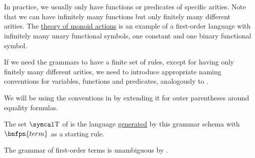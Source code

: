 \begin{definition}
\begin{DefEnum}
\begin{bnf*}
       \\
      \bnfmore                  {\hspace{3cm} \vdots} \\
       \\
      \bnfmore                  {\hspace{3cm} \vdots} \\
               { \bnfor} \\
       \\
       \\
    \end{bnf*}

    In practice, we usually only have functions or predicates of specific arities. Note that we can have infinitely many functions but only finitely many different arities. The \hyperref[rem:theory_of_left_monoid_actions]{theory of monoid actions} is an example of a first-order language with infinitely many unary functional symbols, one constant and one binary functional symbol.

    If we need the grammars to have a finite set of rules, except for having only finitely many different arities, we need to introduce appropriate naming conventions for variables, functions and predicates, analogously to .

    We will be using the conventions in  by extending it for outer parentheses around equality formulas.

    The set \( \CT \) of  is the language \hyperref[def:grammar_derivation/grammar_language]{generated} by this grammar schema with \( \bnfpn{term} \) as a starting rule.

    The grammar of first-order terms is unambiguous by .


\end{DefEnum}
\end{definition}
